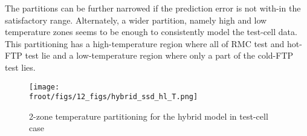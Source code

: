 The partitions can be further narrowed if the prediction error is not with-in the satisfactory range. Alternately, a wider partition, namely high and low temperature zones seems to be enough to consistently model the test-cell data. This partitioning has a high-temperature region where all of RMC test and hot-FTP test lie and a low-temperature region where only a part of the cold-FTP test lies.

\begin{figure}[H]
        \centering
        \texttt{[image: \\froot/figs/12\_figs/hybrid\_ssd\_hl\_T.png]}
        \caption{2-zone temperature partitioning for the hybrid model in test-cell case}
\end{figure}
